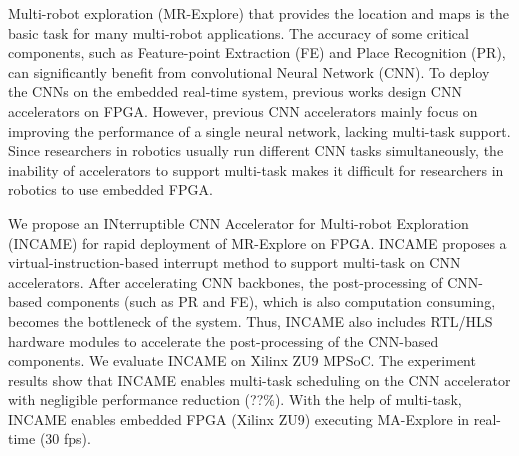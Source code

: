 Multi-robot exploration (MR-Explore) that provides the location and maps is the basic task for many multi-robot applications. 
The accuracy of some critical components, such as Feature-point Extraction (FE) and Place Recognition (PR), can significantly benefit from convolutional Neural Network (CNN). 
To deploy the CNNs on the embedded real-time system, previous works design CNN accelerators on FPGA. 
However, previous CNN accelerators mainly focus on improving the performance of a single neural network, lacking multi-task support.
Since researchers in robotics usually run different CNN tasks simultaneously, the inability of accelerators to support multi-task makes it difficult for researchers in robotics to use embedded FPGA.

We propose an INterruptible CNN Accelerator for Multi-robot Exploration (INCAME) for rapid deployment of MR-Explore on FPGA.
INCAME proposes a virtual-instruction-based interrupt method to support multi-task on CNN accelerators.
After accelerating  CNN backbones, the post-processing of  CNN-based components (such as PR and FE), which is also computation consuming, becomes the bottleneck of the system.
Thus, INCAME also includes RTL/HLS hardware modules to accelerate the post-processing of the CNN-based components.
We evaluate INCAME on Xilinx ZU9 MPSoC. The experiment results show that INCAME enables multi-task scheduling on the CNN accelerator with negligible performance reduction (??\%). With the help of multi-task, INCAME enables embedded FPGA (Xilinx ZU9) executing MA-Explore in real-time (30 fps).

